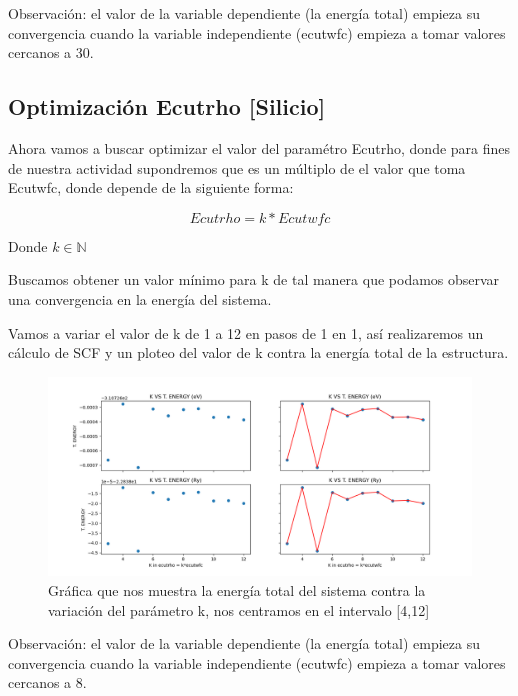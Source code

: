 Observación: el valor de la variable dependiente (la energía total) empieza su convergencia cuando 
la variable independiente (ecutwfc) empieza a tomar valores cercanos a 30.

\newpage

\subsection{Optimización Ecutrho [Silicio] }

Ahora vamos a buscar optimizar el valor del paramétro Ecutrho, donde para fines de nuestra actividad 
supondremos que es un múltiplo de el valor que toma Ecutwfc, donde depende de la siguiente forma:

\begin{equation*}
    Ecutrho = k*Ecutwfc
\end{equation*}

Donde $ k \in \mathbb{N}  $

\vspace{0.5cm}

Buscamos obtener un valor mínimo para k de tal manera que podamos observar una convergencia en la 
energía del sistema.

\vspace{0.5cm}

Vamos a variar el valor de k de 1 a 12 en pasos de 1 en 1, así realizaremos un cálculo de
SCF y un ploteo del valor de k contra la energía total de la estructura.

\begin{figure}[H]
    \centering
    \includegraphics[scale=0.52]{images/k_vs_T_energy.png}
    \caption{Gráfica que nos muestra la energía total del sistema contra la variación del parámetro k, nos centramos en el intervalo [4,12]}
\end{figure}

Observación: el valor de la variable dependiente (la energía total) empieza su convergencia cuando 
la variable independiente (ecutwfc) empieza a tomar valores cercanos a 8.

